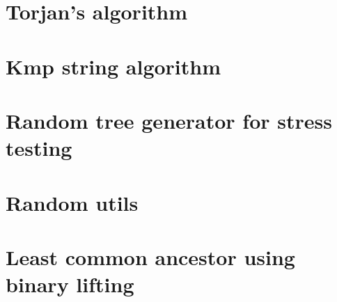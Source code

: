 \section{Torjan's algorithm}
\raggedbottom

\section{Kmp string algorithm}
\raggedbottom

\section{Random tree generator for stress testing}
\raggedbottom

\section{Random utils}
\raggedbottom

\section{Least common ancestor using binary lifting}
\raggedbottom